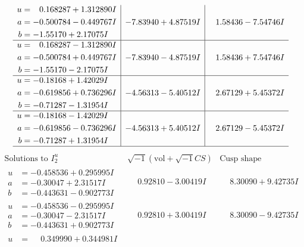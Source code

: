 \documentclass[1p]{elsarticle_modified}
\theoremstyle{definition}
\newcommand{\I}{\sqrt{-1}}
\begin{document}
$$\begin{array}{c|c|c}
\begin{aligned}
u &= \phantom{-}0.168287 + 1.312890 I \\
a &= -0.500784 - 0.449767 I \\
b &= -1.55170 + 2.17075 I\end{aligned}
 & -7.83940 + 4.87519 I & \phantom{-}1.58436 - 7.54746 I \\ \hline\begin{aligned}
u &= \phantom{-}0.168287 - 1.312890 I \\
a &= -0.500784 + 0.449767 I \\
b &= -1.55170 - 2.17075 I\end{aligned}
 & -7.83940 - 4.87519 I & \phantom{-}1.58436 + 7.54746 I \\ \hline\begin{aligned}
u &= -0.18168 + 1.42029 I \\
a &= -0.619856 + 0.736296 I \\
b &= -0.71287 - 1.31954 I\end{aligned}
 & -4.56313 - 5.40512 I & \phantom{-}2.67129 + 5.45372 I \\ \hline\begin{aligned}
u &= -0.18168 - 1.42029 I \\
a &= -0.619856 - 0.736296 I \\
b &= -0.71287 + 1.31954 I\end{aligned}
 & -4.56313 + 5.40512 I & \phantom{-}2.67129 - 5.45372 I\\
 \hline 
 \end{array}$$\newpage$$\begin{array}{c|c|c}  
\text{Solutions to }I^u_{2}& \I (\text{vol} + \sqrt{-1}CS) & \text{Cusp shape}\\
 \hline 
\begin{aligned}
u &= -0.458536 + 0.295995 I \\
a &= -0.30047 + 2.31517 I \\
b &= -0.443631 - 0.902773 I\end{aligned}
 & \phantom{-}0.92810 - 3.00419 I & \phantom{-}8.30090 + 9.42735 I \\ \hline\begin{aligned}
u &= -0.458536 - 0.295995 I \\
a &= -0.30047 - 2.31517 I \\
b &= -0.443631 + 0.902773 I\end{aligned}
 & \phantom{-}0.92810 + 3.00419 I & \phantom{-}8.30090 - 9.42735 I \\ \hline\begin{aligned}
u &= \phantom{-}0.349990 + 0.344981 I \\

\end{aligned}
\end{array}$$
\end{document}
